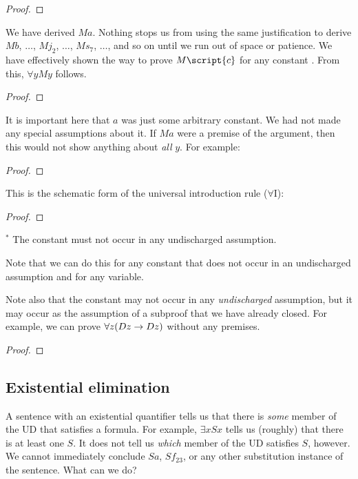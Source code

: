 \begin{proof}
	 
	 
\end{proof}

We have derived $Ma$. Nothing stops us from using the same justification to derive $Mb$, $\ldots$, $Mj_2$, $\ldots$, $Ms_7$, $\ldots$, and so on until we run out of space or patience. We have effectively shown the way to prove $M\script{c}$ for any constant . From this, $\forall y My$ follows.

\begin{proof}
	 
	 
\end{proof}

It is important here that $a$ was just some arbitrary constant. We had not made any special assumptions about it. If $Ma$ were a premise of the argument, then this would not show anything about \emph{all} $y$. For example:

\begin{proof}
	 
	 
\end{proof}


This is the schematic form of the universal introduction rule ($\forall$I):

\begin{proof}
	 
\end{proof}
$^\ast$ The constant  must not occur in any undischarged assumption.

Note that we can do this for any constant that does not occur in an undischarged assumption and for any variable.

Note also that the constant may not occur in any \emph{undischarged} assumption, but it may occur as the assumption of a subproof that we have already closed. For example, we can prove $\forall z(Dz \rightarrow Dz)$ without any premises.

\begin{proof}
	\open
	\close
\end{proof}


\subsection{Existential elimination}
A sentence with an existential quantifier tells us that there is \emph{some} member of the UD that satisfies a formula. For example, $\exists x Sx$ tells us (roughly) that there is at least one $S$. It does not tell us \emph{which} member of the UD satisfies $S$, however. We cannot immediately conclude $Sa$, $Sf_{23}$, or any other substitution instance of the sentence. What can we do?

